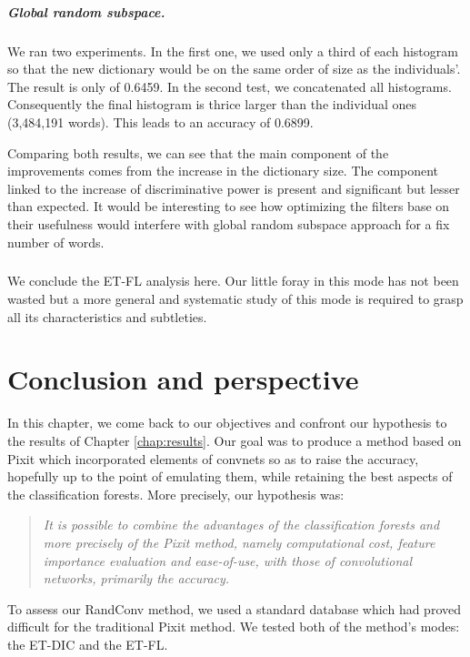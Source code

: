 \documentclass[a4paper]{report}
\newlength{\larg}
\begin{document}
	\paragraph{Global random subspace.}
	We ran two experiments. In the first one, we used only a third of each histogram so that the new dictionary would be on the same order of size as the individuals'. The result is only of 0.6459. In the second test, we concatenated all histograms. Consequently the final histogram is thrice larger than the individual ones (3,484,191 words). This leads to an accuracy of 0.6899. 
	\par
	Comparing both results, we can see that the main component of the improvements comes from the increase in the dictionary size. The component linked to the increase of discriminative power is present and significant but lesser than expected. It would be interesting to see how optimizing the filters base on their usefulness would interfere with global random subspace approach for a fix number of words.
	
	\paragraph{}
	We conclude the ET-FL analysis here. Our little foray in this mode has not been wasted but a more general and systematic study of this mode is required to grasp all its characteristics and subtleties.
	
	
\chapter{\label{chap:conclusion}Conclusion and perspective}
In this chapter, we come back to our objectives and confront our hypothesis to the results of Chapter \ref{chap:results}. Our goal was to produce a method based on Pixit which incorporated elements of convnets so as to raise the accuracy, hopefully up to the point of emulating them, while retaining the best aspects of the classification forests. More precisely, our hypothesis was: 
\begin{quote}
\itshape
It is possible to combine the advantages of the classification forests and more precisely of the Pixit method, namely computational cost, feature importance evaluation and ease-of-use, with those of convolutional networks, primarily the accuracy.
\end{quote}
To assess our RandConv method, we used a standard database which had proved difficult for the traditional Pixit method. We tested both of the method's modes: the ET-DIC and the ET-FL. 
\end{document}
